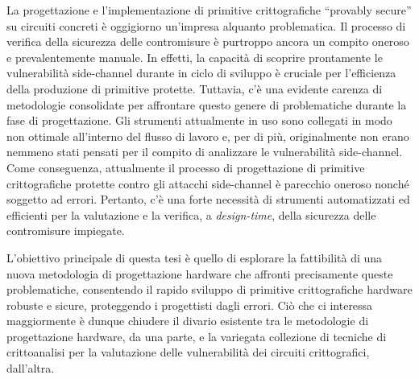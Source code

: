 La progettazione e l'implementazione di primitive crittografiche ``provably secure'' su circuiti 
concreti è oggigiorno un'impresa alquanto problematica. 
Il processo di verifica della sicurezza delle contromisure è purtroppo ancora un compito oneroso 
e prevalentemente manuale.
In effetti, la capacità di scoprire prontamente le vulnerabilità side-channel 
durante in ciclo di sviluppo %
è cruciale per l'efficienza della produzione di primitive protette.
Tuttavia, c'è una evidente carenza di metodologie consolidate per affrontare questo genere di 
problematiche durante la fase di progettazione.
Gli strumenti attualmente in uso sono collegati in modo non ottimale all'interno del flusso di 
lavoro e, per di più, originalmente non erano nemmeno stati pensati per il compito di analizzare 
le vulnerabilità side-channel. Come conseguenza, attualmente il processo di progettazione di 
primitive crittografiche protette contro gli attacchi side-channel è parecchio oneroso nonché 
soggetto ad errori. 
Pertanto, c'è una forte necessità di strumenti automatizzati ed efficienti per la valutazione e la 
verifica, a \emph{design-time}, della sicurezza delle contromisure impiegate.

L'obiettivo principale di questa tesi è quello di esplorare la fattibilità di una nuova metodologia di 
progettazione hardware che affronti precisamente queste problematiche, consentendo il rapido 
sviluppo di primitive crittografiche hardware robuste e sicure, 
proteggendo i progettisti dagli errori. %
%
Ciò che ci interessa maggiormente è dunque chiudere il divario esistente tra le metodologie di 
progettazione hardware, da una parte, e la variegata collezione di tecniche di crittoanalisi per la 
valutazione delle vulnerabilità dei circuiti crittografici, dall'altra.

